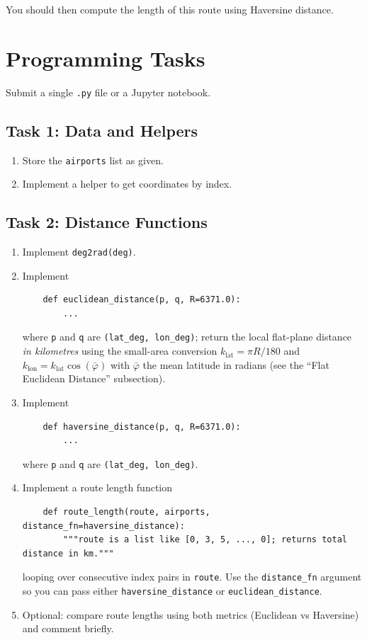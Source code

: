 \documentclass[11pt]{article}
\begin{document}
You should then compute the length of this route using Haversine distance.

\section{Programming Tasks}
Submit a single \texttt{.py} file or a Jupyter notebook.

\subsection*{Task 1: Data and Helpers}
\begin{enumerate}
    \item Store the \texttt{airports} list as given.
    \item Implement a helper to get coordinates by index.
\end{enumerate}

\subsection*{Task 2: Distance Functions}
\begin{enumerate}
    \item Implement \texttt{deg2rad(deg)}.
    \item Implement
    \begin{verbatim}
    def euclidean_distance(p, q, R=6371.0):
        ...
    \end{verbatim}
    where \texttt{p} and \texttt{q} are \texttt{(lat\_deg, lon\_deg)}; return the local flat-plane distance \emph{in kilometres} using the small-area conversion
    $k_{\text{lat}}=\pi R/180$ and $k_{\text{lon}}=k_{\text{lat}}\cos(\bar{\varphi})$ with $\bar{\varphi}$ the mean latitude in radians (see the ``Flat Euclidean Distance'' subsection).
    \item Implement
    \begin{verbatim}
    def haversine_distance(p, q, R=6371.0):
        ...
    \end{verbatim}
    where \texttt{p} and \texttt{q} are \texttt{(lat\_deg, lon\_deg)}.
    \item Implement a route length function
    \begin{verbatim}
    def route_length(route, airports, distance_fn=haversine_distance):
        """route is a list like [0, 3, 5, ..., 0]; returns total distance in km."""
    \end{verbatim}
    looping over consecutive index pairs in \texttt{route}. Use the \texttt{distance\_fn} argument so you can pass either \texttt{haversine\_distance} or \texttt{euclidean\_distance}.
    \item Optional: compare route lengths using both metrics (Euclidean vs Haversine) and comment briefly.
\end{enumerate}
\end{document}
